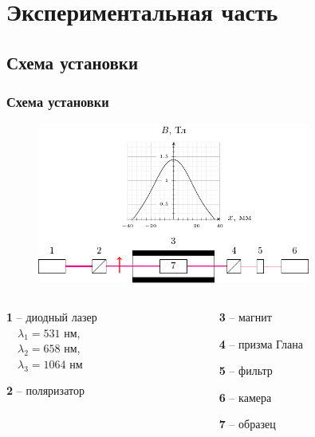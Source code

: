 \documentclass[10pt,pdf,hyperref={unicode}, dvipsnames, handout]{beamer}
\begin{document}
\section{Экспериментальная часть}
\begin{frame}
	\subsection{Схема установки}
	\frametitle{Схема установки}
	\begin{figure}[tb]
		\centering
		\includegraphics[width=0.8\textwidth]{img/chem}
	\end{figure}
	\begin{columns}
		\hspace{2.5cm}
		\begin{column}{0.3\textwidth}
			
			
			\textbf{1} -- диодный лазер\\ 
			$\quad\lambda_1=531$ нм,\\
			$\quad\lambda_2=658$ нм,\\
			$\quad\lambda_3=1064$ нм
			
			
			\textbf{2} -- поляризатор
			
		\end{column}
		\hspace{1.6cm}
		\begin{column}{0.7\textwidth}
			
			\textbf{3} -- магнит
			
			\textbf{4} -- призма Глана
			
			\textbf{5} -- фильтр
			
			\textbf{6} -- камера
			
			\textbf{7} -- образец
		\end{column}
	\end{columns}
	
\end{frame}
\end{document}
